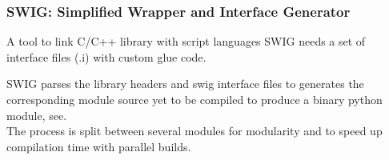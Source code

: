 \documentclass[8pt]{beamer}
\begin{document}
\begin{frame}
  \frametitle{SWIG: Simplified Wrapper and Interface Generator}
  \begin{block}{A tool to link C/C++ library with script languages}
  SWIG needs a set of interface files (.i) with custom glue code.
  
    SWIG parses the library headers and swig interface files to
  generates the corresponding module source yet to be compiled to
  produce a binary python module, see.\\
  The process is split between several modules for modularity and to speed up compilation
  time with parallel builds.
  \end{block}
  \centering {}
\end{frame}
\end{document}
